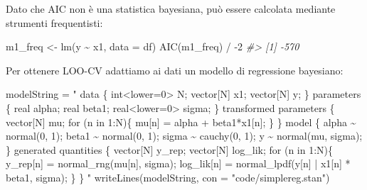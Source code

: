 \documentclass[
  10pt,
  italian,
  a4paper,
  extrafontsizes,onecolumn,openright
  ]{memoir}
\newenvironment{Shaded}{\begin{snugshade}}{\end{snugshade}}
\newcommand{\AttributeTok}[1]{\textcolor[rgb]{0.77,0.63,0.00}{#1}}
\newcommand{\CommentTok}[1]{\textcolor[rgb]{0.56,0.35,0.01}{\textit{#1}}}
\newcommand{\DecValTok}[1]{\textcolor[rgb]{0.00,0.00,0.81}{#1}}
\newcommand{\FunctionTok}[1]{\textcolor[rgb]{0.00,0.00,0.00}{#1}}
\newcommand{\NormalTok}[1]{#1}
\newcommand{\OtherTok}[1]{\textcolor[rgb]{0.56,0.35,0.01}{#1}}
\newcommand{\SpecialCharTok}[1]{\textcolor[rgb]{0.00,0.00,0.00}{#1}}
\newcommand{\StringTok}[1]{\textcolor[rgb]{0.31,0.60,0.02}{#1}}
\theoremstyle{definition}
\theoremstyle{definition}
\theoremstyle{definition}
\theoremstyle{definition}
\theoremstyle{remark}
\begin{document}
Dato che AIC non è una statistica bayesiana, può essere calcolata mediante strumenti frequentisti:

\begin{Shaded}
\begin{Highlighting}[]
\NormalTok{m1\_freq }\OtherTok{\textless{}{-}} \FunctionTok{lm}\NormalTok{(y }\SpecialCharTok{\textasciitilde{}}\NormalTok{ x1, }\AttributeTok{data =}\NormalTok{ df)}
\FunctionTok{AIC}\NormalTok{(m1\_freq) }\SpecialCharTok{/} \SpecialCharTok{{-}}\DecValTok{2}
\CommentTok{\#\textgreater{} [1] {-}570}
\end{Highlighting}
\end{Shaded}

Per ottenere LOO-CV adattiamo ai dati un modello di regressione bayesiano:

\begin{Shaded}
\begin{Highlighting}[]
\NormalTok{modelString }\OtherTok{=} \StringTok{"}
\StringTok{data \{}
\StringTok{  int\textless{}lower=0\textgreater{} N;}
\StringTok{  vector[N] x1;}
\StringTok{  vector[N] y;}
\StringTok{\}}
\StringTok{parameters \{}
\StringTok{  real alpha;}
\StringTok{  real beta1;}
\StringTok{  real\textless{}lower=0\textgreater{} sigma;}
\StringTok{\}}
\StringTok{transformed parameters \{}
\StringTok{  vector[N] mu;}
\StringTok{  for (n in 1:N)\{}
\StringTok{    mu[n] = alpha + beta1*x1[n];}
\StringTok{  \}}
\StringTok{\}}
\StringTok{model \{}
\StringTok{  alpha \textasciitilde{} normal(0, 1);}
\StringTok{  beta1 \textasciitilde{} normal(0, 1);}
\StringTok{  sigma \textasciitilde{} cauchy(0, 1);}
\StringTok{  y \textasciitilde{} normal(mu, sigma);}
\StringTok{\}}
\StringTok{generated quantities \{}
\StringTok{  vector[N] y\_rep;}
\StringTok{  vector[N] log\_lik;}
\StringTok{  for (n in 1:N)\{}
\StringTok{    y\_rep[n] = normal\_rng(mu[n], sigma);}
\StringTok{    log\_lik[n] = normal\_lpdf(y[n] | x1[n] * beta1, sigma);}
\StringTok{  \}}
\StringTok{\}}
\StringTok{"}
\FunctionTok{writeLines}\NormalTok{(modelString, }\AttributeTok{con =} \StringTok{"code/simplereg.stan"}\NormalTok{)}
\end{Highlighting}
\end{Shaded}

\begin{Shaded}
\end{Shaded}
\end{document}
